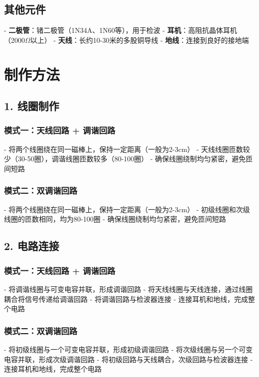 \documentclass[12pt,UTF8]{ctexbook}
\begin{document}
\subsection{其他元件}
- \textbf{二极管}：锗二极管（1N34A、1N60等），用于检波
- \textbf{耳机}：高阻抗晶体耳机（2000$\Omega$以上）
- \textbf{天线}：长约10-30米的多股铜导线
- \textbf{地线}：连接到良好的接地端

\section{制作方法}

\subsection{1. 线圈制作}

\subsubsection{模式一：天线回路 + 调谐回路}
- 将两个线圈绕在同一磁棒上，保持一定距离（一般为2-3cm）
- 天线线圈匝数较少（30-50圈），调谐线圈匝数较多（80-100圈）
- 确保线圈绕制均匀紧密，避免匝间短路

\subsubsection{模式二：双调谐回路}
- 将两个线圈绕在同一磁棒上，保持一定距离（一般为2-3cm）
- 初级线圈和次级线圈的匝数相同，均为80-100圈
- 确保线圈绕制均匀紧密，避免匝间短路

\subsection{2. 电路连接}

\subsubsection{模式一：天线回路 + 调谐回路}
- 将调谐线圈与可变电容并联，形成调谐回路
- 将天线线圈与天线连接，通过线圈耦合将信号传递给调谐回路
- 将调谐回路与检波器连接
- 连接耳机和地线，完成整个电路

\subsubsection{模式二：双调谐回路}
- 将初级线圈与一个可变电容并联，形成初级调谐回路
- 将次级线圈与另一个可变电容并联，形成次级调谐回路
- 将初级回路与天线耦合，次级回路与检波器连接
- 连接耳机和地线，完成整个电路
\end{document}
